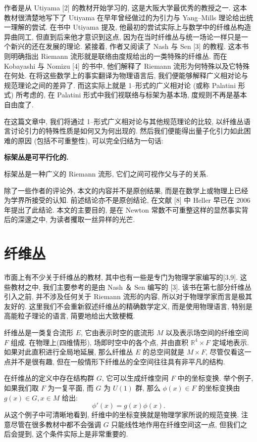 \documentclass{article}
\begin{document}
\indent 作者是从 Utiyama [2] 的教材开始学习的, 这是大阪大学最优秀的教授之一. 这本教材很清楚地写下了 Utiyama 在早年曾经做过的为引力与 Yang--Mills 理论给出统一理解的尝试. 在书中 Utiyama 提及, 他最初的尝试实际上与数学中的纤维丛构造异曲同工, 但直到后来他才意识到这点, 因为在当时纤维丛与统一场论一样只是一个新兴的还在发展的理论. 紧接着, 作者又阅读了 Nash 与 Sen [3] 的教程. 这本书则明确指出 Riemann 流形就是联络由度规给出的一类特殊的纤维丛. 而在 Kobayashi 与 Nomizu [4] 的书中, 他们解释了 Riemann 流形为何特殊以及它特殊在何处. 在将这些数学上的事实翻译为物理语言后, 我们便能够解释广义相对论与规范理论之间的差异了. 而这实际上就是 1--形式的广义相对论 (或称 Palatini 形式) 所考虑的, 在 Palatini 形式中我们视联络与标架为基本场, 度规则不再是基本自由度了.
\par
在这篇文章中, 我们将通过 1--形式广义相对论与其他规范理论的比较, 以纤维丛语言讨论引力的特殊性质是如何又为何出现的. 然后我们便能得出量子化引力如此困难的原因 (包括不可重整性), 可以完全归结为一句话:
\begin{center}
\textbf{标架丛是可平行化的.}
\end{center}
标架丛是一种广义的 Riemann 流形, 它们之间可视作父与子的关系.
\par
除了一些作者的评论外, 本文的内容并不是原创结果, 而是在数学上或物理上已经为学界所接受的认知. 前述结论亦不是原创结论, 在文献 [8] 中 Heller 早已在 2006 年提出了此结论. 本文的主要目的, 是在 Newton 常数不可重整这样的显然事实背后的深邃之中, 为读者攫取一丝异样的光芒.
\section{纤维丛}
市面上有不少关于纤维丛的教材, 其中也有一些是专门为物理学家编写的[3,9]. 这些教材之中, 我们主要参考的是由 Nash ＆ Sen 编写的 [3]. 该书在第七部分纤维丛引入之前, 并不涉及任何关于 Riemann 流形的内容, 所以对于物理学家而言是极其友好的. 这里我们不会重新叙述纤维丛的精确数学定义, 而是使用物理语言, 特别是高能粒子理论的语言, 简要地给出大致梗概.

纤维丛是一类复合流形 $E$, 它由表示时空的底流形 $M$ 以及表示场空间的纤维空间 $F$ 组成. 在物理上(四维情形), 场即时空中的各个点, 并由直积 $\mathbb{R}^{4}\times F$ 定域地表示. 如果对此直积进行全局地延展, 那么纤维丛 $E$ 的总空间就是 $ M\times F$, 尽管仅看这一点并不是很有趣, 但在一般情形下纤维丛的全空间往往具有非平凡的结构.

在纤维丛的定义中存在结构群 $G$, 它可以生成纤维空间 $F$ 中的坐标变换. 举个例子, 如果我们取 $F$ 为一复平面, 而 $G$ 为 $U(1)$ 群, 那么 $\phi(x) \in F$ 的坐标变换由 $g(x) \in G, x \in M$ 给出:
\begin{equation}
\phi'(x)=g(x)\phi(x).
\end{equation}
从这个例子中可清晰地看到, 纤维中的坐标变换就是物理学家所说的规范变换. 注意尽管在很多教材中都不会强调 $G$ 只能线性地作用在纤维空间这一点, 但我们之后会提到, 这个条件实际上是非常重要的. 
\end{document}
